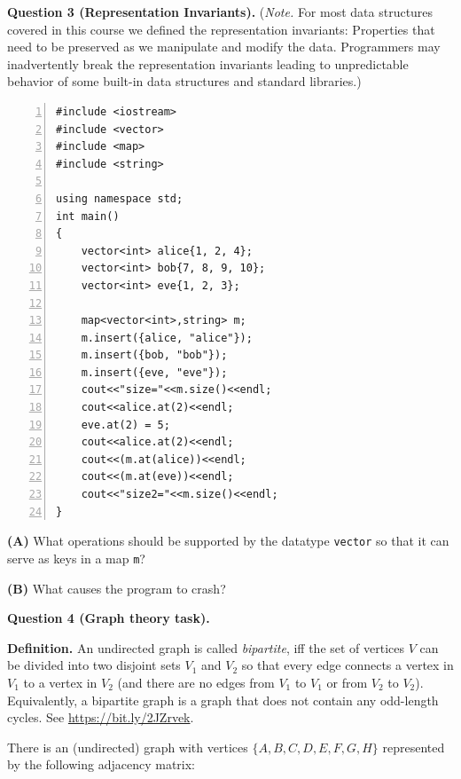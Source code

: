 \documentclass[a4paper,12pt]{article}
\begin{document}
\newpage

% 
\vspace{20pt}
{\bf Question 3 (Representation Invariants).} 
{\footnotesize 
({\em Note.} For most data structures covered in this 
course we defined the representation invariants: Properties
that need to be preserved as we manipulate and modify the data.
Programmers may inadvertently break the representation invariants 
leading to unpredictable behavior of some built-in data structures and
standard libraries.)
}

\begin{Verbatim}[frame=single,numbers=left]
#include <iostream>
#include <vector>
#include <map>
#include <string>

using namespace std;
int main()
{
    vector<int> alice{1, 2, 4};
    vector<int> bob{7, 8, 9, 10};
    vector<int> eve{1, 2, 3};

    map<vector<int>,string> m;
    m.insert({alice, "alice"});
    m.insert({bob, "bob"});
    m.insert({eve, "eve"});
    cout<<"size="<<m.size()<<endl;
    cout<<alice.at(2)<<endl;
    eve.at(2) = 5;
    cout<<alice.at(2)<<endl;
    cout<<(m.at(alice))<<endl;
    cout<<(m.at(eve))<<endl;
    cout<<"size2="<<m.size()<<endl;
}
\end{Verbatim}


\vspace{5pt}
{\bf (A)} What operations should be supported by the 
datatype {\tt vector} so that it can serve as keys in a map {\tt m}? 

\vspace{5pt}
{\bf (B)} What causes the program to crash?


\newpage

\vspace{20pt}
{\bf Question 4 (Graph theory task).} 

{\bf Definition.} An undirected graph is called {\em bipartite}, 
iff the set of vertices $V$ can be divided into two disjoint sets $V_1$ and $V_2$ 
so that every edge connects a vertex in $V_1$ to a vertex in $V_2$ (and 
there are no edges from $V_1$ to $V_1$ or from $V_2$ to $V_2$).\\
Equivalently, a bipartite graph is a graph that does not contain any odd-length cycles.
See \url{https://bit.ly/2JZrvek}. 

\vspace{10pt}
There is an (undirected) graph with vertices $\{A,B,C,D,E,F,G,H\}$
represented by the following 
adjacency matrix: 
\end{document}
